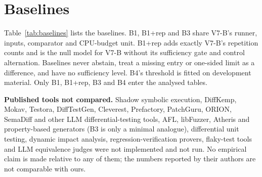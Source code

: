 \section{Baselines}\label{sec:baselines}
Table~\ref{tab:baselines} lists the baselines. B1, B1+rep and B3 share V7-B's runner, inputs, comparator and CPU-budget unit. B1+rep adds exactly V7-B's repetition counts and is the null model for V7-B without its sufficiency gate and control alternation. Baselines never abstain, treat a missing entry or one-sided limit as a difference, and have no sufficiency level. B4's threshold is fitted on development material. Only B1, B1+rep, B3 and B4 enter the analysed tables.

\textbf{Published tools not compared.} Shadow symbolic execution, DiffKemp, Mokav, Testora, DiffTestGen, Cleverest, Prefactory, PatchGuru, ORION, SemaDiff and other LLM differential-testing tools, AFL, libFuzzer, Atheris and property-based generators (B3 is only a minimal analogue), differential unit testing, dynamic impact analysis, regression-verification provers, flaky-test tools and LLM equivalence judges were not implemented and not run. No empirical claim is made relative to any of them; the numbers reported by their authors are not comparable with ours.

